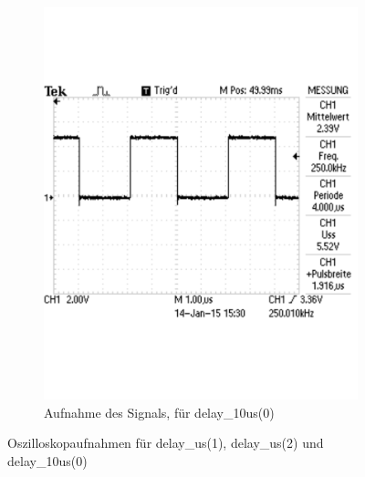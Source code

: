 \documentclass[12pt,a4paper]{article}
\begin{document}
\begin{figure}[H]
\begin{subfigure}[b]{0.28\textwidth}
  \includegraphics[trim = 0mm 50mm 0mm 50mm, clip, width=\textwidth, scale = 0.4]{TEK0010.pdf}
  \caption[Aufnahme des Signals, für delay\_10us(0)]{Aufnahme des Signals, für delay\_10us(0)} 
  \label{fig:g_3}
\end{subfigure}
\caption{Oszilloskopaufnahmen für delay\_us(1), delay\_us(2) und delay\_10us(0)}
\label{fig:g_main_1}
\end{figure}
\end{document}
